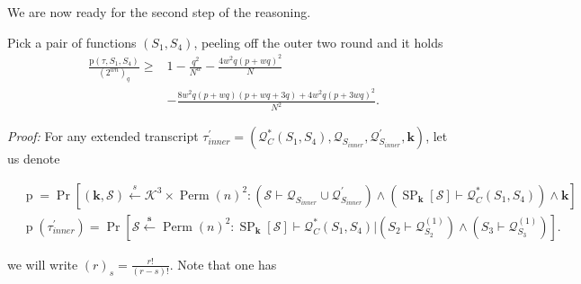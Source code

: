 We are now ready for the second step of the reasoning.

\begin{lemma}
	\label{lemma:innter-ratio-4-rounds}
	
	Pick a pair of functions $(S_{1}, S_{4})$, peeling off the outer two round and it holds
	\begin{align}
	\frac{\mathrm{p}\left(\tau, S_{1}, S_{4}\right)}{\left(2^{w n}\right)_{q}} \geq &1-\frac{q^2}{N^w}- \frac{4 w^2 q(p+wq)^2}{N}\\
	&- \frac{8 w^2 q(p+w q)(p+w q +3 q)+4 w^2 q(p+3 wq)^2}{N^2}.
	\label{eq:bound-innter-ratio-4-rounds}
	\end{align}
\end{lemma}


\noindent \emph{Proof:}  For any extended transcript $\tau_{inner}^{\prime}=\left(\mathcal{Q}_{C}^{*}\left(S_{1}, S_{4}\right), \mathcal{Q}_{S_{inner}}, \mathcal{Q}_{S_{inner}}^{\prime}, \mathbf{k}\right)$, let us denote

$$
\begin{aligned}
&\operatorname{p} =  \operatorname{Pr}\left[\left(\mathbf{k}, \mathcal{S}\right) \stackrel{s}{\leftarrow} \mathcal{K}^{3} \times \operatorname{Perm}(n)^{2}:
\left(\mathcal{S} \vdash \mathcal{Q}_{S_{inner}} \cup \mathcal{Q}_{S_{inner}}^{\prime}\right) \wedge \left(\operatorname{SP}_{\mathbf{k}}[\mathcal{S}] \vdash \mathcal{Q}_{C}^{*}\left(S_{1},S_{4}\right)\right) \wedge\mathbf{k}\right]\\
&\operatorname{p}\left(\tau_{inner}^{\prime}\right) =\operatorname{Pr}\left[\mathcal{S} \stackrel{\mathbf{s}}{\leftarrow} \operatorname{Perm}(n)^{2}: \operatorname{SP}_{\mathbf{k}}[\mathcal{S}] \vdash \mathcal{Q}_{C}^{*}\left(S_{1},S_{4}\right) |\left(S_{2} \vdash \mathcal{Q}_{S_{2}}^{(1)}\right) \wedge\left(S_{3} \vdash \mathcal{Q}_{S_{3}}^{(1)}\right)\right].
\end{aligned}
$$

we will write $(r)_{s} = \frac{r!}{(r-s)!}$. Note that one has

